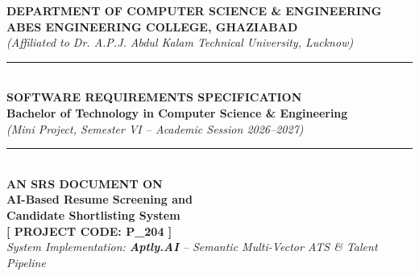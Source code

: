 \documentclass[12pt, a4paper]{article}
\begin{document}
\begin{titlepage}

    \centering
    \vspace*{0.3cm}
    
    {\large \textbf{\color{primary} DEPARTMENT OF COMPUTER SCIENCE \& ENGINEERING}}\\[0.15cm]
    {\Large \textbf{ABES ENGINEERING COLLEGE, GHAZIABAD}}\\[0.1cm]
    {\footnotesize \textit{(Affiliated to Dr. A.P.J. Abdul Kalam Technical University, Lucknow)}}\\[0.5cm]
    
    {\color{secondary}\rule{0.85\textwidth}{1.2pt}}\\[0.25cm]
    {\LARGE \textbf{\color{primary} SOFTWARE REQUIREMENTS SPECIFICATION}}\\[0.15cm]
    {\normalsize \textbf{Bachelor of Technology in Computer Science \& Engineering}}\\[0.1cm]
    {\small \textit{(Mini Project, Semester VI -- Academic Session 2026--2027)}}\\[0.25cm]
    {\color{secondary}\rule{0.85\textwidth}{1.2pt}}\\[0.8cm]
    
    {\small \textbf{AN SRS DOCUMENT ON}}\\[0.35cm]
    
    {\huge \bfseries \color{primary} AI-Based Resume Screening and}\\[0.25cm]
    {\huge \bfseries \color{primary} Candidate Shortlisting System}\\[0.45cm]
    
    {\Large \textbf{\color{secondary} [ PROJECT CODE: P\_204 ]}}\\[0.3cm]
    {\normalsize \textit{System Implementation: \textbf{Aptly.AI} -- Semantic Multi-Vector ATS \& Talent Pipeline}}\\[1.2cm]
    

\end{titlepage}
\end{document}
